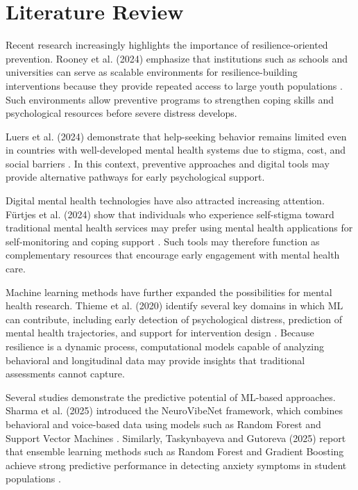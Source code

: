 \documentclass[conference]{IEEEtran}
\begin{document}
\section{Literature Review}

Recent research increasingly highlights the importance of resilience-oriented prevention. Rooney et al. (2024) emphasize that institutions such as schools and universities can serve as scalable environments for resilience-building interventions because they provide repeated access to large youth populations \cite{Rooney2024}. Such environments allow preventive programs to strengthen coping skills and psychological resources before severe distress develops.

Luers et al. (2024) demonstrate that help-seeking behavior remains limited even in countries with well-developed mental health systems due to stigma, cost, and social barriers \cite{Luers2024}. In this context, preventive approaches and digital tools may provide alternative pathways for early psychological support.

Digital mental health technologies have also attracted increasing attention. Fürtjes et al. (2024) show that individuals who experience self-stigma toward traditional mental health services may prefer using mental health applications for self-monitoring and coping support \cite{Frtjes2024}. Such tools may therefore function as complementary resources that encourage early engagement with mental health care.

Machine learning methods have further expanded the possibilities for mental health research. Thieme et al. (2020) identify several key domains in which ML can contribute, including early detection of psychological distress, prediction of mental health trajectories, and support for intervention design \cite{Thieme}. Because resilience is a dynamic process, computational models capable of analyzing behavioral and longitudinal data may provide insights that traditional assessments cannot capture.

Several studies demonstrate the predictive potential of ML-based approaches. Sharma et al. (2025) introduced the NeuroVibeNet framework, which combines behavioral and voice-based data using models such as Random Forest and Support Vector Machines \cite{Sharma}. Similarly, Taskynbayeva and Gutoreva (2025) report that ensemble learning methods such as Random Forest and Gradient Boosting achieve strong predictive performance in detecting anxiety symptoms in student populations \cite{taskynbayeva2025machine}.
\end{document}
